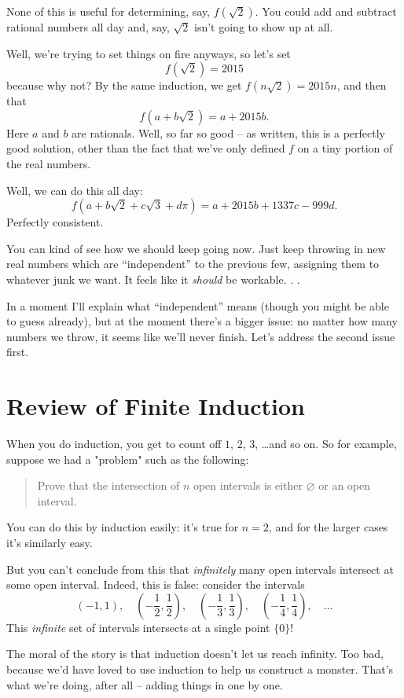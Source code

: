 None of this is useful for determining, say, $f(\sqrt 2)$.
You could add and subtract rational numbers all day
and, say, $\sqrt 2$ isn't going to show up at all.

Well, we're trying to set things on fire anyways, so let's set
\[ f(\sqrt 2) = 2015 \]
because why not?
By the same induction, we get $f(n\sqrt2) = 2015n$, and then that
\[ f\left( a + b \sqrt 2 \right) = a + 2015b. \]
Here $a$ and $b$ are rationals.
Well, so far so good -- as written, this is a perfectly good solution,
other than the fact that we've only defined $f$ on a tiny portion of the real numbers.

Well, we can do this all day:
\[ f\left( a + b \sqrt 2 + c \sqrt 3 + d \pi \right) = a + 2015b + 1337c - 999d. \]
Perfectly consistent.

You can kind of see how we should keep going now.
Just keep throwing in new real numbers which are ``independent''
to the previous few, assigning them to whatever junk we want.
It feels like it \emph{should} be workable. . .

In a moment I'll explain what ``independent'' means (though you
might be able to guess already), but at the moment there's a bigger issue:
no matter how many numbers we throw, it seems like we'll never finish.
Let's address the second issue first.

\section{Review of Finite Induction}
When you do induction, you get to count off $1$, $2$, $3$, \dots and so on.
So for example, suppose we had a "problem" such as the following:
\begin{quote}
	Prove that the intersection of $n$ open intervals is either $\varnothing$
	or an open interval.
\end{quote}
You can do this by induction easily: it's true for $n = 2$, and
for the larger cases it's similarly easy.

But you can't conclude from this that \emph{infinitely} many open intervals intersect
at some open interval. Indeed, this is false: consider the intervals
\[
	\left( -1, 1 \right), \quad
	\left( -\frac12, \frac12 \right), \quad
	\left( -\frac13, \frac13 \right), \quad
	\left( -\frac14, \frac14 \right), \quad
	\dots
\]
This \emph{infinite} set of intervals intersects at a single point $\{0\}$!

The moral of the story is that induction doesn't let us reach infinity.
Too bad, because we'd have loved to use induction to help us construct a monster.
That's what we're doing, after all -- adding things in one by one.

